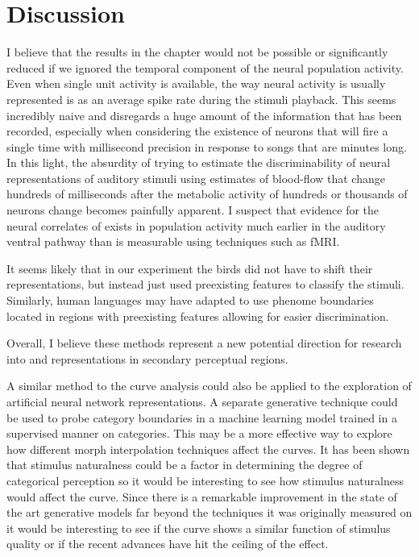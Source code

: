 \chapter{Discussion}
I believe that the results in the \CP chapter would not be possible or significantly reduced if we ignored the temporal component of the neural population activity. Even when single unit activity is available, the way neural activity is usually represented is as an average spike rate during the stimuli playback. This seems incredibly naive and disregards a huge amount of the information that has been recorded, especially when considering the existence of neurons that will fire a single time with millisecond precision in response to songs that are minutes long. In this light, the absurdity of trying to estimate the discriminability of neural representations of auditory stimuli using estimates of blood-flow that change hundreds of milliseconds after the metabolic activity of hundreds or thousands of neurons change becomes painfully apparent. I suspect that evidence for the neural correlates of \CP exists in population activity much earlier in the auditory ventral pathway than is measurable using techniques such as fMRI.

It seems likely that in our experiment the birds did not have to shift their representations, but instead just used preexisting features to classify the stimuli. Similarly, human languages may have adapted to use phenome boundaries located in regions with preexisting features allowing for easier discrimination\cite{kuhl1975speech,stevens1981constraints}.

Overall, I believe these methods represent a new potential direction for research into \CP and representations in secondary perceptual regions.

A similar method to the \Thielk curve analysis could also be applied to the exploration of artificial neural network representations. A separate generative technique could be used to probe category boundaries in a machine learning model trained in a supervised manner on categories. This may be a more effective way to explore how different morph interpolation techniques affect the curves. It has been shown that stimulus naturalness could be a factor in determining the degree of categorical perception\cite{van1999categorical} so it would be interesting to see how stimulus naturalness would affect the \Thielk curve. Since there is a remarkable improvement in the state of the art generative models\cite{GAIA, van2016wavenet, waveglow} far beyond the techniques it was originally measured on it would be interesting to see if the \Thielk curve shows a similar function of stimulus quality or if the recent advances have hit the ceiling of the effect.

